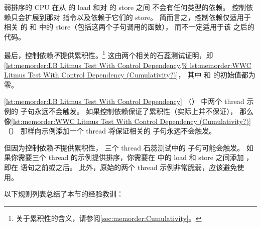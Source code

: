 弱排序的 CPU 在从  的 load 和对  的 store 之间
不会有任何类型的依赖。
控制依赖只会扩展到那对  指令以及依赖于它们的 store。
简而言之，控制依赖仅适用于相关  的 
和  中的 store（包括这两个子句调用的函数），
而不一定适用于该  之后的代码。

最后，控制依赖\emph{不}提供累积性。\footnote{
	关于累积性的含义，请参阅\cref{sec:memorder:Cumulativity}。}
这由两个相关的石蕊测试证明，即
\cref{lst:memorder:LB Litmus Test With Control Dependency,%
lst:memorder:WWC Litmus Test With Control Dependency (Cumulativity?)}，
其中  和  的初始值都为零。

\begin{listing}

\caption{带控制依赖的 LB 石蕊测试}
\label{lst:memorder:LB Litmus Test With Control Dependency}
\end{listing}

\cref{lst:memorder:LB Litmus Test With Control Dependency}
（）
中两个 thread 示例的  子句永远不会触发。
如果控制依赖保证了累积性（实际上并不保证），
那么像\cref{lst:memorder:WWC Litmus Test With Control Dependency (Cumulativity?)}
（）
那样向示例添加一个 thread 将保证相关的  子句永远不会触发。

\begin{listing}

\caption{带控制依赖的 WWC 石蕊测试（有累积性吗？）}
\label{lst:memorder:WWC Litmus Test With Control Dependency (Cumulativity?)}
\end{listing}

但因为控制依赖\emph{不}提供累积性，
三个 thread 石蕊测试中的  子句可能会触发。
如果你需要三个 thread 的示例提供排序，你需要在  中的
load 和 store 之间添加 ，
即在  语句之前或之后。
此外，原始的两个 thread 示例非常脆弱，应该避免使用。

\QuickQuizEnd

以下规则列表总结了本节的经验教训：

